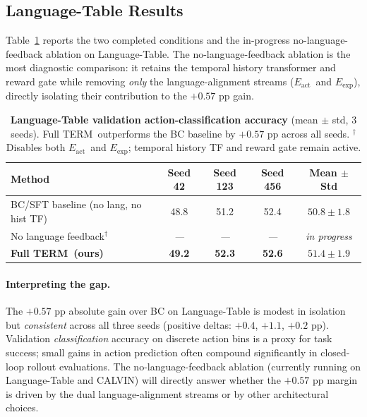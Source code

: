 \documentclass{article}
\newcommand{\modelname}{\textsc{TERM}\xspace}
\newcommand{\Lact}{$E_{\mathrm{act}}$\xspace}
\newcommand{\Lexp}{$E_{\mathrm{exp}}$\xspace}
\newcommand{\tbd}{\textit{---}\xspace}
\begin{document}
\subsection{Language-Table Results}
\label{sec:lt_results}

Table~\ref{tab:lt_results} reports the two completed conditions and the
in-progress no-language-feedback ablation on Language-Table.
The no-language-feedback ablation is the most diagnostic comparison:
it retains the temporal history transformer and reward gate while removing
\emph{only} the language-alignment streams (\Lact\ and \Lexp), directly
isolating their contribution to the $+0.57$ pp gain.

\begin{table}[t]
\centering
\caption{
  \textbf{Language-Table validation action-classification accuracy}
  (mean $\pm$ std, 3 seeds).
  Full \modelname\ outperforms the BC baseline by $+0.57$ pp across all seeds.
  $^\dagger$Disables both \Lact\ and \Lexp; temporal history TF and reward gate remain active.
}
\label{tab:lt_results}
\small
\setlength{\tabcolsep}{5pt}
\begin{tabular}{lcccc}
\toprule
\textbf{Method} & \textbf{Seed 42} & \textbf{Seed 123} & \textbf{Seed 456}
                & \textbf{Mean $\pm$ Std} \\
\midrule
BC/SFT baseline (no lang, no hist TF)
  & 48.8 & 51.2 & 52.4 & $50.8 \pm 1.8$ \\
No language feedback$^\dagger$
  & \tbd & \tbd & \tbd & \textit{in progress} \\
\midrule
\textbf{Full \modelname\ (ours)}
  & \textbf{49.2} & \textbf{52.3} & \textbf{52.6} & $\mathbf{51.4 \pm 1.9}$ \\
\bottomrule
\end{tabular}
\end{table}

\paragraph{Interpreting the gap.}
The $+0.57$ pp absolute gain over BC on Language-Table
is modest in isolation but \emph{consistent} across all three seeds
(positive deltas: $+0.4$, $+1.1$, $+0.2$ pp).
Validation \emph{classification} accuracy on discrete action bins is a proxy
for task success; small gains in action prediction often compound significantly
in closed-loop rollout evaluations.
The no-language-feedback ablation (currently running on Language-Table and CALVIN)
will directly answer whether the $+0.57$ pp margin is driven by the dual
language-alignment streams or by other architectural choices.
\end{document}
